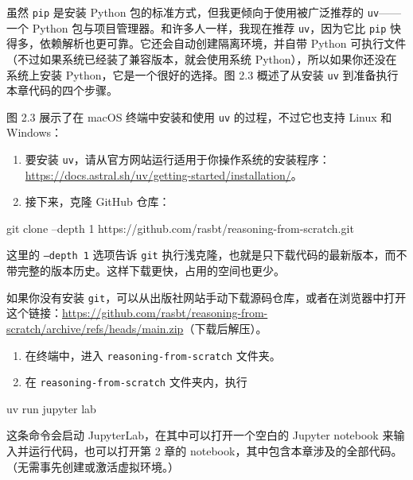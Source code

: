 虽然 \texttt{pip} 是安装 Python 包的标准方式，但我更倾向于使用被广泛推荐的 \texttt{uv}——一个 Python 包与项目管理器。和许多人一样，我现在推荐 \texttt{uv}，因为它比 \texttt{pip} 快得多，依赖解析也更可靠。它还会自动创建隔离环境，并自带 Python 可执行文件（不过如果系统已经装了兼容版本，就会使用系统 Python），所以如果你还没在系统上安装 Python，它是一个很好的选择。图 2.3 概述了从安装 \texttt{uv} 到准备执行本章代码的四个步骤。


图 2.3 展示了在 macOS 终端中安装和使用 \texttt{uv} 的过程，不过它也支持 Linux 和 Windows：

\begin{enumerate}
\item 要安装 \texttt{uv}，请从官方网站运行适用于你操作系统的安装程序：\href{https://docs.astral.sh/uv/getting-started/installation/}{https://docs.astral.sh/uv/getting-started/installation/}。
\item 接下来，克隆 GitHub 仓库：
\end{enumerate}

\begin{codebox}
git clone --depth 1 https://github.com/rasbt/reasoning-from-scratch.git
\end{codebox}

这里的 \texttt{--depth 1} 选项告诉 \texttt{git} 执行浅克隆，也就是只下载代码的最新版本，而不带完整的版本历史。这样下载更快，占用的空间也更少。

如果你没有安装 \texttt{git}，可以从出版社网站手动下载源码仓库，或者在浏览器中打开这个链接：\href{https://github.com/rasbt/reasoning-from-scratch/archive/refs/heads/main.zip}{https://github.com/rasbt/reasoning-from-scratch/archive/refs/heads/main.zip}（下载后解压）。

\begin{enumerate}
\item 在终端中，进入 \texttt{reasoning-from-scratch} 文件夹。
\item 在 \texttt{reasoning-from-scratch} 文件夹内，执行
\end{enumerate}

\begin{codebox}
uv run jupyter lab
\end{codebox}

这条命令会启动 JupyterLab，在其中可以打开一个空白的 Jupyter notebook 来输入并运行代码，也可以打开第 2 章的 notebook，其中包含本章涉及的全部代码。（无需事先创建或激活虚拟环境。）


